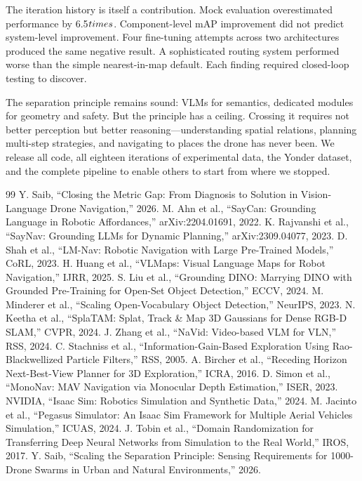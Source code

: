 \documentclass[conference]{IEEEtran}
\begin{document}
The iteration history is itself a contribution. Mock evaluation
overestimated performance by 6.5$\\times$. Component-level mAP improvement did
not predict system-level improvement. Four fine-tuning attempts across
two architectures produced the same negative result. A sophisticated
routing system performed worse than the simple nearest-in-map default.
Each finding required closed-loop testing to discover.

The separation principle remains sound: VLMs for semantics, dedicated
modules for geometry and safety. But the principle has a ceiling.
Crossing it requires not better perception but better
reasoning---understanding spatial relations, planning multi-step
strategies, and navigating to places the drone has never been. We
release all code, all eighteen iterations of experimental data, the
Yonder dataset, and the complete pipeline to enable others to start
from where we stopped.

\begin{thebibliography}{99}
 Y. Saib, ``Closing the Metric Gap: From Diagnosis to Solution in Vision-Language Drone Navigation,'' 2026.
 M. Ahn et al., ``SayCan: Grounding Language in Robotic Affordances,'' arXiv:2204.01691, 2022.
 K. Rajvanshi et al., ``SayNav: Grounding LLMs for Dynamic Planning,'' arXiv:2309.04077, 2023.
 D. Shah et al., ``LM-Nav: Robotic Navigation with Large Pre-Trained Models,'' CoRL, 2023.
 H. Huang et al., ``VLMaps: Visual Language Maps for Robot Navigation,'' IJRR, 2025.
 S. Liu et al., ``Grounding DINO: Marrying DINO with Grounded Pre-Training for Open-Set Object Detection,'' ECCV, 2024.
 M. Minderer et al., ``Scaling Open-Vocabulary Object Detection,'' NeurIPS, 2023.
 N. Keetha et al., ``SplaTAM: Splat, Track \& Map 3D Gaussians for Dense RGB-D SLAM,'' CVPR, 2024.
 J. Zhang et al., ``NaVid: Video-based VLM for VLN,'' RSS, 2024.
 C. Stachniss et al., ``Information-Gain-Based Exploration Using Rao-Blackwellized Particle Filters,'' RSS, 2005.
 A. Bircher et al., ``Receding Horizon Next-Best-View Planner for 3D Exploration,'' ICRA, 2016.
 D. Simon et al., ``MonoNav: MAV Navigation via Monocular Depth Estimation,'' ISER, 2023.
 NVIDIA, ``Isaac Sim: Robotics Simulation and Synthetic Data,'' 2024.
 M. Jacinto et al., ``Pegasus Simulator: An Isaac Sim Framework for Multiple Aerial Vehicles Simulation,'' ICUAS, 2024.
 J. Tobin et al., ``Domain Randomization for Transferring Deep Neural Networks from Simulation to the Real World,'' IROS, 2017.
 Y. Saib, ``Scaling the Separation Principle: Sensing Requirements for 1000-Drone Swarms in Urban and Natural Environments,'' 2026.
\end{thebibliography}
\end{document}
